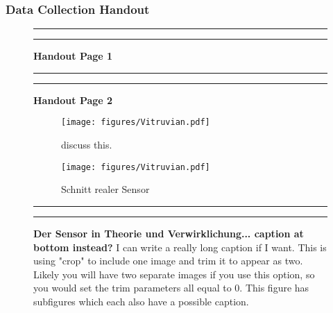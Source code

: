 \documentclass[]{article}
\begin{document}
\newpage
\subsubsection{Data Collection Handout}
\label{sec:appendix-data-handout}

\begin{figure}[!ht]
    \hrule
    \caption{ \textbf{Handout Page 1} }
    \begin{center}
    \end{center}
    \label{fig:handout-1}
    \hrule
\end{figure}

\newpage

\begin{figure}[!ht]
    \hrule
    \caption{ \textbf{Handout Page 2} }
    \begin{center}
    \end{center}
    \label{fig:handout-2}
    \hrule
\end{figure}

\newpage

\begin{figure}[!ht]
    \begin{subfigure}[h]{0.5\textwidth}
    \centering
            \texttt{[image: figures/Vitruvian.pdf]}
        \caption{ \citet{Thomas:2020} discuss this. }
        \label{fig:sub-first}
    \end{subfigure}
    \begin{subfigure}[h]{0.5\textwidth}
    \centering
        \texttt{[image: figures/Vitruvian.pdf]}
            \caption{Schnitt realer Sensor \citep{Thomas:2020}}
        \label{fig:sub-second}
    \end{subfigure}
    \vspace{2.5mm}
    \hrule
    \vspace{2.5mm}
        \caption{\textbf{ Der Sensor in Theorie und Verwirklichung... caption at bottom instead? }  I can write a really long caption if I want. \newline This is using "crop" to include one image and trim it to appear as two.  Likely you will have two separate images if you use this option, so you would set the trim parameters all equal to 0.  \newline   This figure has subfigures which each also have a possible caption.   }
        \label{fig:combined}
    \vspace{-2.5mm}
    \hrule
\end{figure}
\end{document}
